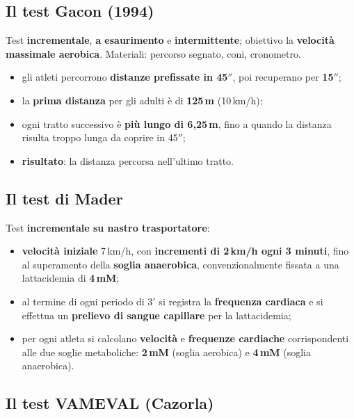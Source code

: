 \subsection{Il test Gacon (1994)}

Test \textbf{incrementale}, \textbf{a esaurimento} e \textbf{intermittente}; obiettivo la
\textbf{velocità massimale aerobica}. Materiali: percorso segnato, coni, cronometro.

\begin{itemize}
  \item gli atleti percorrono \textbf{distanze prefissate in 45$''$}, poi recuperano per
    \textbf{15$''$};
  \item la \textbf{prima distanza} per gli adulti è di \textbf{125\,m} (10\,km/h);
  \item ogni tratto successivo è \textbf{più lungo di 6,25\,m}, fino a quando la distanza risulta
    troppo lunga da coprire in 45$''$;
  \item \textbf{risultato}: la distanza percorsa nell'ultimo tratto.
\end{itemize}

\subsection{Il test di Mader}

Test \textbf{incrementale su nastro trasportatore}:
\begin{itemize}
  \item \textbf{velocità iniziale} 7\,km/h, con \textbf{incrementi di 2\,km/h ogni 3 minuti}, fino
    al superamento della \textbf{soglia anaerobica}, convenzionalmente fissata a una lattacidemia di
    \textbf{4\,mM};
  \item al termine di ogni periodo di 3$'$ si registra la \textbf{frequenza cardiaca} e si effettua
    un \textbf{prelievo di sangue capillare} per la lattacidemia;
  \item per ogni atleta si calcolano \textbf{velocità} e \textbf{frequenze cardiache} corrispondenti
    alle due soglie metaboliche: \textbf{2\,mM} (soglia aerobica) e \textbf{4\,mM} (soglia
    anaerobica).
\end{itemize}

\subsection{Il test VAMEVAL (Cazorla)}

